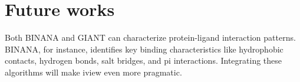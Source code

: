 \section{Future works}

Both BINANA \citep{1413} and GIANT \citep{1359} can characterize protein-ligand interaction patterns. BINANA, for instance, identifies key binding characteristics like hydrophobic contacts, hydrogen bonds, salt bridges, and pi interactions. Integrating these algorithms will make iview even more pragmatic.


\chapterend
